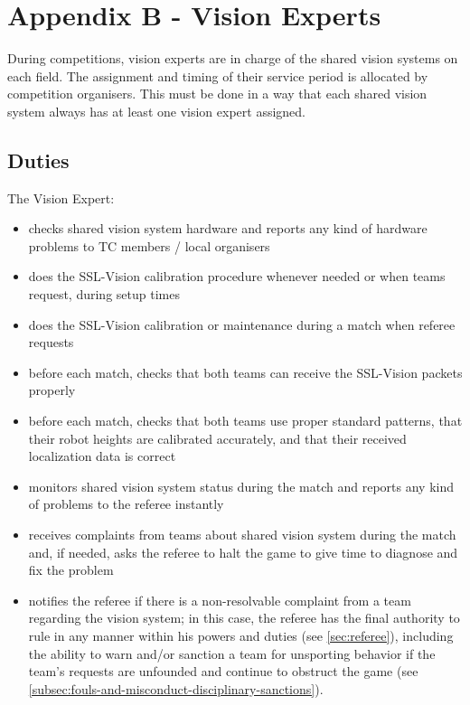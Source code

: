\section{Appendix B - Vision Experts}\label{app:vision-experts}

During competitions, vision experts are in charge of the shared vision systems on each field.
The assignment and timing of their service period is allocated by competition organisers.
This must be done in a way that each shared vision system always has at least one vision expert assigned.

\subsection{Duties}
The Vision Expert:
\begin{itemize}
\item checks shared vision system hardware and reports any kind of hardware problems to TC members / local organisers
\item does the SSL-Vision calibration procedure whenever needed or when teams request, during setup times
\item does the SSL-Vision calibration or maintenance during a match when referee requests
\item before each match, checks that both teams can receive the SSL-Vision packets properly
\item before each match, checks that both teams use proper standard patterns, that their robot heights are calibrated accurately, and that their received localization data is correct
\item monitors shared vision system status during the match and reports any kind of problems to the referee instantly
\item receives complaints from teams about shared vision system during the match and, if needed, asks the referee to halt the game to give time to diagnose and fix the problem
\item notifies the referee if there is a non-resolvable complaint from a team regarding the vision system; in this case, the referee has the final authority to rule in any manner within his powers and duties (see \autoref{sec:referee}), including the ability to warn and/or sanction a team for unsporting behavior if the team's requests are unfounded and continue to obstruct the game (see \autoref{subsec:fouls-and-misconduct-disciplinary-sanctions}).
\end{itemize}